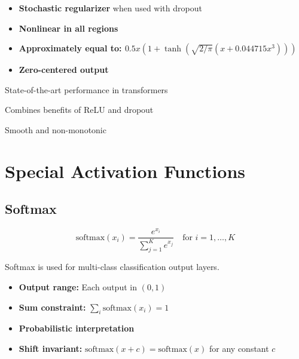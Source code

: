 \begin{properties}
\begin{itemize}
    \item \textbf{Stochastic regularizer} when used with dropout
    \item \textbf{Nonlinear in all regions}
    \item \textbf{Approximately equal to: $0.5x(1 + \tanh(\sqrt{2/\pi}(x + 0.044715x^3)))$}
    \item \textbf{Zero-centered output}
\end{itemize}
\end{properties}

\begin{advantages}
    \item State-of-the-art performance in transformers
    \item Combines benefits of ReLU and dropout
    \item Smooth and non-monotonic
\end{advantages}

\section{Special Activation Functions}

\subsection{Softmax}

\begin{equation}
\text{softmax}(x_i) = \frac{e^{x_i}}{\sum_{j=1}^{K} e^{x_j}} \quad \text{for } i = 1, \ldots, K
\end{equation}

Softmax is used for multi-class classification output layers.

\begin{properties}
\begin{itemize}
    \item \textbf{Output range:} Each output in $(0, 1)$
    \item \textbf{Sum constraint:} $\sum_i \text{softmax}(x_i) = 1$
    \item \textbf{Probabilistic interpretation}
    \item \textbf{Shift invariant:} $\text{softmax}(x + c) = \text{softmax}(x)$ for any constant $c$
\end{itemize}
\end{properties}

